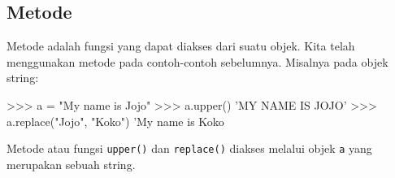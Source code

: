 


\subsection{Metode}

Metode adalah fungsi yang dapat diakses dari suatu objek.
Kita telah menggunakan metode pada contoh-contoh sebelumnya.
Misalnya pada objek string:
\begin{pyconcode}
>>> a = "My name is Jojo"
>>> a.upper()
'MY NAME IS JOJO'
>>> a.replace("Jojo", "Koko")
'My name is Koko
\end{pyconcode}
Metode atau fungsi \texttt{upper()} dan \texttt{replace()} diakses melalui objek
\texttt{a} yang merupakan sebuah string.

